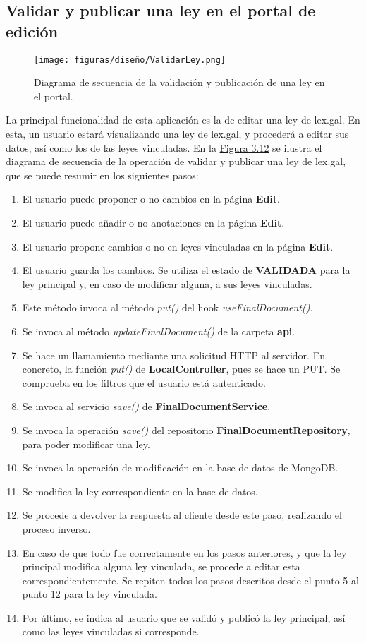 \subsection{Validar y publicar una ley en el portal de edición}

\begin{figure}[H]
\centerline{\texttt{[image: figuras/diseño/ValidarLey.png]}}
\caption{Diagrama de secuencia de la validación y publicación de una ley en el portal.}
\label{enlaceDValidarLEXGALCuerpo}
\end{figure}

La principal funcionalidad de esta aplicación es la de editar una ley de lex.gal. En esta, un usuario estará visualizando una ley de lex.gal, y procederá a editar sus datos, así como los de las leyes vinculadas. En la \hyperref[enlaceDValidarLEXGALCuerpo]{Figura 3.12} se ilustra el diagrama de secuencia de la operación de validar y publicar una ley de lex.gal, que se puede resumir en los siguientes pasos:

\begin{enumerate}
    \item El usuario puede proponer o no cambios en la página {\bf Edit}.
    \item El usuario puede añadir o no anotaciones en la página {\bf Edit}.
    \item El usuario propone cambios o no en leyes vinculadas en la página {\bf Edit}.
    \item El usuario guarda los cambios. Se utiliza el estado de {\bf VALIDADA} para la ley principal y, en caso de modificar alguna, a sus leyes vinculadas.
    \item Este método invoca al método {\it put()} del hook {\it useFinalDocument()}.
    \item Se invoca al método {\it updateFinalDocument()} de la carpeta  {\bf api}.
    \item Se hace un llamamiento mediante una solicitud HTTP al servidor. En concreto, la función {\it put()} de {\bf LocalController}, pues se hace un PUT. Se comprueba en los filtros que el usuario está autenticado.
    \item Se invoca al servicio {\it save()} de {\bf FinalDocumentService}.
    \item Se invoca la operación {\it save()} del repositorio {\bf FinalDocumentRepository}, para poder modificar una ley.
    \item Se invoca la operación de modificación en la base de datos de MongoDB.
    \item Se modifica la ley correspondiente en la base de datos.
    \item Se procede a devolver la respuesta al cliente desde este paso, realizando el proceso inverso.
    \item En caso de que todo fue correctamente en los pasos anteriores, y que la ley principal modifica alguna ley vinculada, se procede a editar esta correspondientemente. Se repiten todos los pasos descritos desde el punto 5 al punto 12 para la ley vinculada.
    \item Por último, se indica al usuario que se validó y publicó la ley principal, así como las leyes vinculadas si corresponde.
\end{enumerate}